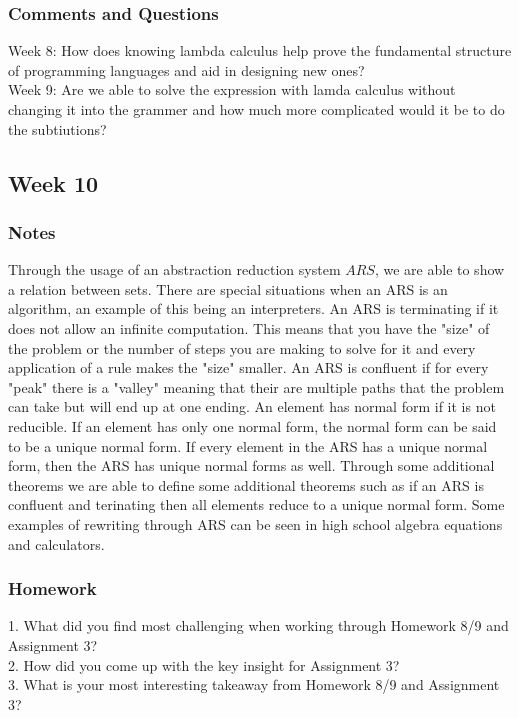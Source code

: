 \documentclass{article}
\theoremstyle{theorem}
\theoremstyle{definition}
\theoremstyle{remark}
\begin{document}
\subsubsection{Comments and Questions}

Week 8: How does knowing lambda calculus help prove the fundamental structure of programming languages and aid in designing new ones? \\
Week 9: Are we able to solve the expression with lamda calculus without changing it into the grammer and how much more complicated would it be to do the subtiutions?

\subsection{Week 10}
\subsubsection{Notes}

Through the usage of an abstraction reduction system \(ARS\), we are able to show a relation between sets. 
There are special situations when an ARS is an algorithm, an example of this being an interpreters. 
An ARS is terminating if it does not allow an infinite computation. This means that you have the
"size" of the problem or the number of steps you are making to solve for it and every application 
of a rule makes the "size" smaller. An ARS is confluent if for every "peak" there is a "valley" 
meaning that their are multiple paths that the problem can take but will end up at one ending. An 
element has normal form if it is not reducible. If an element has only one normal form, the normal
form can be said to be a unique normal form. If every element in the ARS has a unique normal form, then 
the ARS has unique normal forms as well.  Through some additional theorems we are able to define some additional 
theorems such as if an ARS is confluent and terinating then all elements reduce to a unique normal form. Some 
examples of rewriting through ARS can be seen in high school algebra equations and calculators.

\subsubsection{Homework}
1. What did you find most challenging when working through Homework 8/9 and Assignment 3?\\
2. How did you come up with the key insight for Assignment 3?\\
3. What is your most interesting takeaway from Homework 8/9 and Assignment 3?\\
\end{document}
